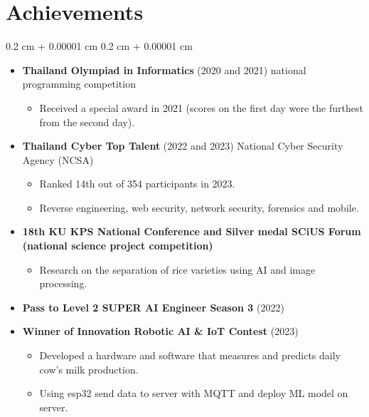 \documentclass[10pt,letterpaper]{extarticle}
\newenvironment{highlights}{
    \begin{itemize}[
        topsep=0.10 cm,
        parsep=0.10 cm,
        partopsep=0pt,
        itemsep=0pt,
        leftmargin=0.4 cm + 10pt
    ]
}{
    \end{itemize}
} %
\newenvironment{onecolentry}{
    \begin{adjustwidth}{
        0.2 cm + 0.00001 cm
    }{
        0.2 cm + 0.00001 cm
    }
}{
    \end{adjustwidth}
} %
\begin{document}
    \section{Achievements}
        \begin{onecolentry}
            \begin{highlights}
                \item \textbf{Thailand Olympiad in Informatics} (2020 and 2021) national programming competition
                    \begin{highlights}
                        \item Received a special award in 2021 (scores on the first day were the furthest from the second day).
                    \end{highlights}
                
                \item \textbf{Thailand Cyber Top Talent} (2022 and 2023) National Cyber Security Agency (NCSA)
                    \begin{highlights}
                        \item Ranked 14th out of 354 participants in 2023.
                        \item Reverse engineering, web security, network security, forensics and mobile.
                    \end{highlights}

                \item \textbf{18th KU KPS National Conference and Silver medal SCiUS Forum (national science project competition)}
                    \begin{highlights}
                        \item Research on the separation of rice varieties using AI and image processing.
                    \end{highlights}
                \item \textbf{Pass to Level 2 SUPER AI Engineer Season 3} (2022)

                \item \textbf{Winner of Innovation Robotic AI \& IoT Contest} (2023)
                    \begin{highlights}
                        \item Developed a hardware and software that measures and predicts daily cow's milk production.
                        \item Using esp32 send data to server with MQTT and deploy ML model on server.
                    \end{highlights}

            \end{highlights}
        \end{onecolentry}
\end{document}
